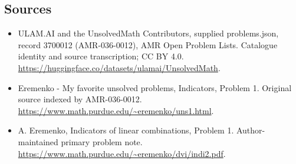 \documentclass[11pt,a4paper]{article}
\begin{document}
\subsection{Sources}
\begin{itemize}
\item[S1] ULAM.AI and the UnsolvedMath Contributors, supplied problems.json, record 3700012 (AMR-036-0012), AMR Open Problem Lists. Catalogue identity and source transcription; CC BY 4.0.
\url{https://huggingface.co/datasets/ulamai/UnsolvedMath}.
\item[S2] Eremenko - My favorite unsolved problems, Indicators, Problem 1. Original source indexed by AMR-036-0012.
\url{https://www.math.purdue.edu/~eremenko/uns1.html}.
\item[S3] A. Eremenko, Indicators of linear combinations, Problem 1. Author-maintained primary problem note.
\url{https://www.math.purdue.edu/~eremenko/dvi/indi2.pdf}.
\end{itemize}
\end{document}
